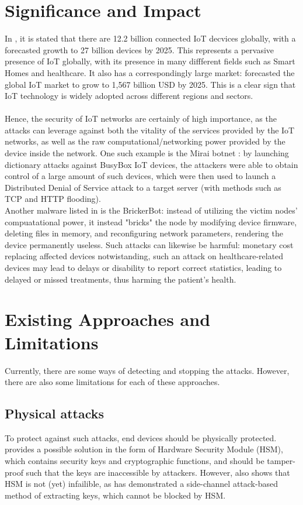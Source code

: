 \documentclass{article}
\begin{document}
\section{Significance and Impact}
In \cite{hasan.2022}, it is stated that there are 12.2 billion connected IoT decvices globally, with a forecasted growth to 27 billion devices by 2025. This represents a pervasive presence of IoT globally, with its presence in many diffferent fields such as Smart Homes and healthcare. It also has a correspondingly large market: \cite{9210375} forecasted the global IoT market to grow to 1,567 billion USD by 2025. This is a clear sign that IoT technology is widely adopted across different regions and sectors.\\
\\
Hence, the security of IoT networks are certainly of high importance, as the attacks can leverage against both the vitality of the services provided by the IoT networks, as well as the raw computational/networking power provided by the device inside the network. One such example is the Mirai botnet \cite{7971869}: by launching dictionary attacks against BusyBox IoT devices, the attackers were able to obtain control of a large amount of such devices, which were then used to launch a Distributed Denial of Service attack to a target server (with methods such as TCP and HTTP flooding).\\
Another malware listed in \cite{7971869} is the BrickerBot: instead of utilizing the victim nodes' compuatational power, it instead "bricks" the node by modifying device firmware, deleting files in memory, and reconfiguring network parameters, rendering the device permanently useless. Such attacks can likewise be harmful: monetary cost replacing affected devices notwistanding, such an attack on healthcare-related devices may lead to delays or disability to report correct statistics, leading to delayed or missed treatments, thus harming the patient's health.

\section{Existing Approaches and Limitations}
Currently, there are some ways of detecting and stopping the attacks. However, there are also some limitations for each of these approaches.
\subsection{Physical attacks}
To protect against such attacks, end devices should be physically protected. \cite{8766430} provides a possible solution in the form of Hardware Security Module (HSM), which contains security keys and cryptographic functions, and should be tamper-proof such that the keys are inaccessible by attackers. However, \cite{8766430} also shows that HSM is not (yet) infailible, as \cite{10.1007/978-3-319-24174-6_24} has demonstrated a side-channel attack-based method of extracting keys, which cannot be blocked by HSM.
\end{document}
